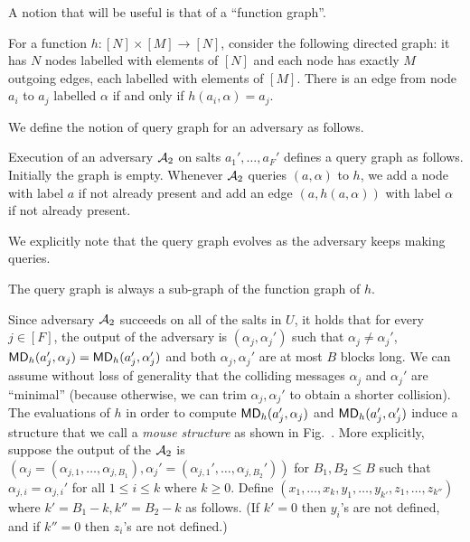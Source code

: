 A notion that will be useful is that of a ``function graph''. 
\begin{definition}
For a function $h:[N]\times [M]\to [N]$, consider the following directed graph: it has $N$ nodes labelled with elements of $[N]$ and each node has exactly $M$ outgoing edges, each labelled with elements of $[M]$. There is an edge from node $a_i$ to $a_j$ labelled $\alpha$ if and only if $h(a_i,\alpha)=a_j$.
\end{definition}
\noindent We define the notion of query graph for an adversary as follows.
\begin{definition}
Execution of an adversary $\mathcal{A}_2$ on salts $a_1',\ldots,a_F'$ defines a query graph as follows. Initially the graph is empty. Whenever  $\mathcal{A}_2$ queries $(a,\alpha)$ to $h$, we add a node with label $a$ if not already present and add an edge $(a,h(a,\alpha))$ with label $\alpha$ if not already present.
\end{definition}
We explicitly note that the query graph evolves as the adversary keeps making queries. 
\begin{fact}
The query graph is always a sub-graph of the function graph of $h$.
\end{fact}
Since adversary $\mathcal{A}_2$ succeeds on all of the salts in $U$, it holds that for every $j\in [F]$, the output of the adversary is $(\alpha_j,\alpha_j')$ 
such that $\alpha_j\neq \alpha_j'$, $\mathsf{MD}_h(a_j',\alpha_j)=\mathsf{MD}_h(a_j',\alpha_j')$ and both $\alpha_j,\alpha_j'$ are at most $B$ blocks long.
We can assume without loss of generality that the colliding messages $\alpha_j$ and $\alpha_j'$ are ``minimal'' (because otherwise, we can trim $\alpha_j,\alpha_j'$ to obtain a shorter collision).
The evaluations of $h$ in order to compute $\mathsf{MD}_h(a_j',\alpha_j)$ and $\mathsf{MD}_h(a_j',\alpha_j')$ induce a structure that we call a \emph{mouse structure} as shown in Fig.~.
More explicitly, suppose the output of the $\mathcal{A}_2$ is $(\alpha_j=(\alpha_{j,1},\ldots,\alpha_{j,B_1}),\alpha_j'=(\alpha_{j,1}',\ldots,\alpha_{j,B_2}'))$ for $B_1,B_2\leq B$ such that $\alpha_{j,i}=\alpha_{j,i}'$ for all $1 \leq i\leq k$ where $k\geq 0$. 
Define $(x_1,\ldots,x_k,y_1,\ldots,y_{k'},z_1,\ldots,z_{k''})$ where $k'=B_1-k,k''=B_2-k$ as follows. (If $k'=0$ then $y_i$'s are not defined, and if $k''=0$ then $z_i$'s are not defined.)
